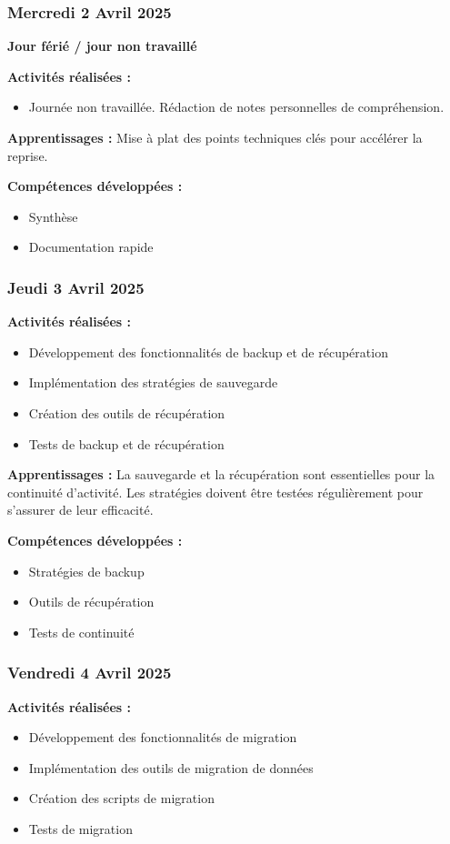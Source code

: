 \documentclass[12pt,a4paper]{article}
\begin{document}
\subsubsection{Mercredi 2 Avril 2025}
\textbf{Jour férié / jour non travaillé}

\textbf{Activités réalisées :}
\begin{itemize}
    \item Journée non travaillée. Rédaction de notes personnelles de compréhension.
\end{itemize}

\textbf{Apprentissages :}
Mise à plat des points techniques clés pour accélérer la reprise.

\textbf{Compétences développées :}
\begin{itemize}
    \item Synthèse
    \item Documentation rapide
\end{itemize}

\subsubsection{Jeudi 3 Avril 2025}
\textbf{Activités réalisées :}
\begin{itemize}
    \item Développement des fonctionnalités de backup et de récupération
    \item Implémentation des stratégies de sauvegarde
    \item Création des outils de récupération
    \item Tests de backup et de récupération
\end{itemize}

\textbf{Apprentissages :}
La sauvegarde et la récupération sont essentielles pour la continuité d'activité. Les stratégies doivent être testées régulièrement pour s'assurer de leur efficacité.

\textbf{Compétences développées :}
\begin{itemize}
    \item Stratégies de backup
    \item Outils de récupération
    \item Tests de continuité
\end{itemize}

\subsubsection{Vendredi 4 Avril 2025}
\textbf{Activités réalisées :}
\begin{itemize}
    \item Développement des fonctionnalités de migration
    \item Implémentation des outils de migration de données
    \item Création des scripts de migration
    \item Tests de migration
\end{itemize}
\end{document}
